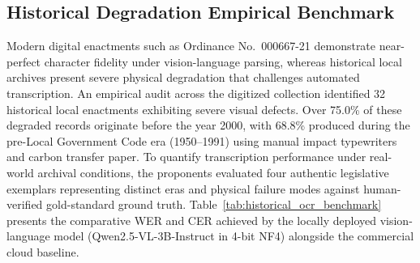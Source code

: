 \subsection{Historical Degradation Empirical Benchmark}
\label{sec:historical_degradation_benchmark}

Modern digital enactments such as Ordinance No.~000667-21 demonstrate near-perfect character fidelity under vision-language parsing, whereas historical local archives present severe physical degradation that challenges automated transcription. An empirical audit across the digitized collection identified 32 historical local enactments exhibiting severe visual defects. Over 75.0\% of these degraded records originate before the year 2000, with 68.8\% produced during the pre-Local Government Code era (1950--1991) using manual impact typewriters and carbon transfer paper. To quantify transcription performance under real-world archival conditions, the proponents evaluated four authentic legislative exemplars representing distinct eras and physical failure modes against human-verified gold-standard ground truth. Table~\ref{tab:historical_ocr_benchmark} presents the comparative WER and CER achieved by the locally deployed vision-language model (Qwen2.5-VL-3B-Instruct in 4-bit NF4) alongside the commercial cloud baseline.

